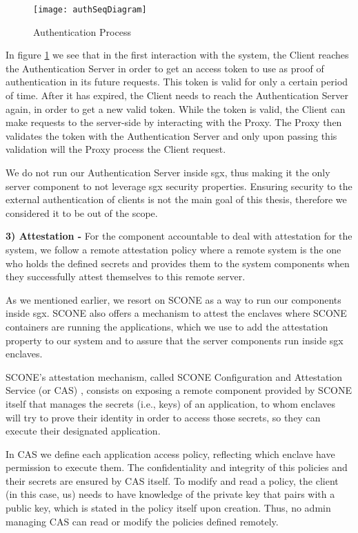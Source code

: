 \begin{figure}[htbp]
	\centering
	{\texttt{[image: authSeqDiagram]}}
	\caption{Authentication Process}
	\label{fig:authProcess}
\end{figure}

In figure \ref{fig:authProcess} we see that in the first interaction with the system, the Client reaches the Authentication Server in order to get an access token to use as proof of authentication in its future requests. This token is valid for only a certain period of time. After it has expired, the Client needs to reach the Authentication Server again, in order to get a new valid token. While the token is valid, the Client can make requests to the server-side by interacting with the Proxy. The Proxy then validates the token with the Authentication Server and only upon passing this validation will the Proxy process the Client request.

We do not run our Authentication Server inside \gls{sgx}, thus making it the only server component to not leverage \gls{sgx} security properties. Ensuring security to the external authentication of clients is not the main goal of this thesis, therefore we considered it to be out of the scope.

\vspace{5mm} 

\textbf{3) Attestation -}
For the component accountable to deal with attestation for the system, we follow a remote attestation policy where a remote system is the one who holds the defined secrets and provides them to the system components when they successfully attest themselves to this remote server.

As we mentioned earlier, we resort on SCONE as a way to run our components inside \gls{sgx}. SCONE also offers a mechanism to attest the enclaves where SCONE containers are running the applications, which we use to add the attestation property to our system and to assure that the server components run inside \gls{sgx} enclaves. 

SCONE's attestation mechanism, called SCONE Configuration and Attestation Service (or CAS) \cite{sconeCAS}, consists on exposing a remote component provided by SCONE itself that manages the secrets (i.e., keys) of an application, to whom enclaves will try to prove their identity in order to access those secrets, so they can execute their designated application. 

In CAS we define each application access policy, reflecting which enclave have permission to execute them. The confidentiality and integrity of this policies and their secrets are ensured by CAS itself. To modify and read a policy, the client (in this case, us) needs to have knowledge of the private key that pairs with a public key, which is stated in the policy itself upon creation. Thus, no admin managing CAS can read or modify the policies defined remotely.




